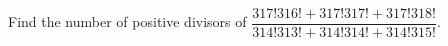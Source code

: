 Find the number of positive divisors of $\dfrac{317!316!+317!317!+317!318!}{314!313!+314!314!+314!315!}$.
